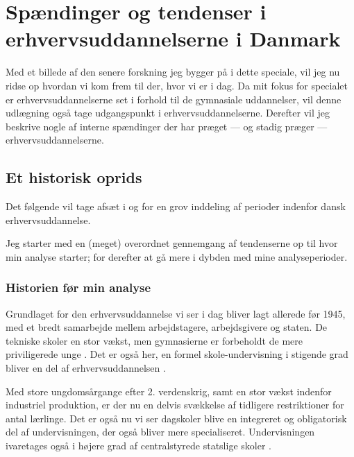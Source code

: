 \chapter{Spændinger og tendenser i erhvervsuddannelserne i Danmark}
Med et billede af den senere forskning jeg bygger på i dette speciale, vil jeg nu ridse op hvordan vi kom frem til der, hvor vi er i dag.
Da mit fokus for specialet er erhvervsuddannelserne set i forhold til de gymnasiale uddannelser, vil denne udlægning også tage udgangspunkt i erhvervsuddannelserne.
Derefter vil jeg beskrive nogle af interne spændinger der har præget — og stadig præger — erhvervsuddannelserne.

\section{Et historisk oprids}

Det følgende vil tage afsæt i \cite{bondergaardHistoricalEmergenceKey2014} og \cite{juulDiskurserOmUngdom2013} for en grov inddeling af perioder indenfor dansk erhvervsuddannelse.

Jeg starter med en (meget) overordnet gennemgang af tendenserne op til hvor min analyse starter; for derefter at gå mere i dybden med mine analyseperioder.

\subsection{Historien før min analyse}

 Grundlaget for den erhvervsuddannelse vi ser i dag bliver lagt allerede før 1945, med et bredt samarbejde mellem arbejdstagere, arbejdsgivere og staten.
De tekniske skoler en stor vækst, men gymnasierne er forbeholdt de mere priviligerede unge \autocite[s. 9]{bondergaardHistoricalEmergenceKey2014}.
Det er også her, en formel skole-undervisning i stigende grad bliver en del af erhvervsuddannelsen \autocite[s. 15ff]{bondergaardHistoricalEmergenceKey2014}. 

Med store ungdomsårgange efter 2. verdenskrig, samt en stor vækst indenfor industriel produktion, er der nu en delvis svækkelse af tidligere restriktioner for antal lærlinge.
Det er også nu vi ser dagskoler blive en integreret og obligatorisk del af undervisningen, der også bliver mere specialiseret.
Undervisningen ivaretages også i højere grad af centralstyrede statslige skoler \autocite[s. 35]{bondergaardHistoricalEmergenceKey2014}.

